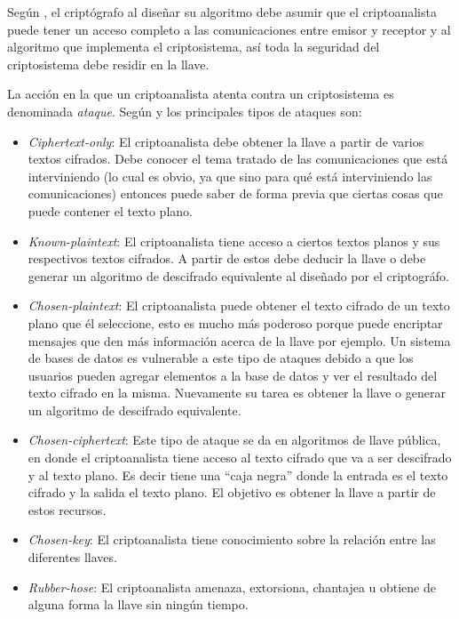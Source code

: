 Según \cite{bruce}, el criptógrafo al diseñar su algoritmo debe asumir que el criptoanalista puede tener un acceso completo a las comunicaciones entre emisor y receptor y al algoritmo que implementa el criptosistema, así toda la seguridad del criptosistema debe residir en la llave.

La acción en la que un criptoanalista atenta contra un criptosistema es denominada \textit{ataque}. Según \cite{bruce} y \cite{denning} los principales tipos de ataques son:
\begin{itemize}

\item \textit{Ciphertext-only}: El criptoanalista debe obtener la llave a partir de varios textos cifrados. Debe conocer el tema tratado de las comunicaciones que está interviniendo (lo cual es obvio, ya que sino para qué está interviniendo las comunicaciones) entonces puede saber de forma previa que ciertas cosas que puede contener el texto plano.

\item \textit{Known-plaintext}: El criptoanalista tiene acceso a ciertos textos planos y sus respectivos textos cifrados. A partir de estos debe deducir la llave o debe generar un algoritmo de descifrado equivalente al diseñado por el criptográfo.

\item \textit{Chosen-plaintext}: El criptoanalista puede obtener el texto cifrado de un texto plano que él seleccione, esto es mucho más poderoso porque puede encriptar mensajes que den más información acerca de la llave por ejemplo. Un sistema de bases de datos es vulnerable a este tipo de ataques debido a que los usuarios pueden agregar elementos a la base de datos y ver el resultado del texto cifrado en la misma. Nuevamente su tarea es obtener la llave o generar un algoritmo de descifrado equivalente.

\item \textit{Chosen-ciphertext}: Este tipo de ataque se da en algoritmos de llave pública, en donde el criptoanalista tiene acceso al texto cifrado que va a ser descifrado y al texto plano. Es decir tiene una ``caja negra'' donde la entrada es el texto cifrado y la salida el texto plano. El objetivo es obtener la llave a partir de estos recursos.

\item \textit{Chosen-key}: El criptoanalista tiene conocimiento sobre la relación entre las diferentes llaves.

\item \textit{Rubber-hose}: El criptoanalista amenaza, extorsiona, chantajea u obtiene de alguna forma la llave sin ningún tiempo.
\end{itemize}


